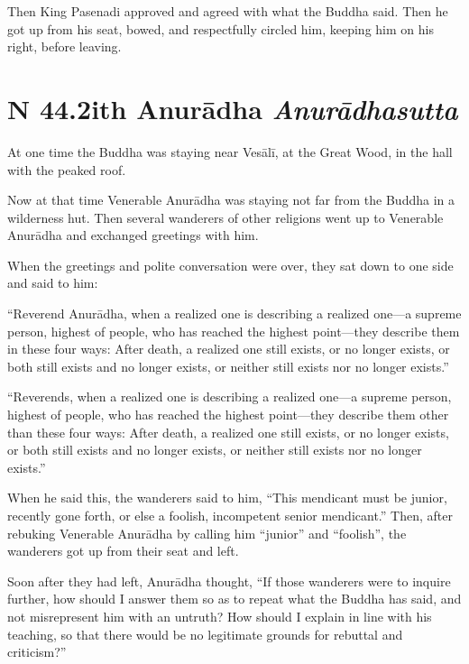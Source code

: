 \documentclass[12pt,openany]{book}%
\newcommand*{\suttatitleacronym}[1]{\smaller[2]{#1}\vspace*{.3em}}
\newcommand*{\suttatitletranslation}[1]{\linebreak{#1}}
\newcommand*{\suttatitleroot}[1]{\linebreak\smaller[2]\itshape{#1}}
\newcommand*{\tocacronym}[1]{\hspace*{-3.3em}{#1}\quad}
\newcommand*{\toctranslation}[1]{#1}
\newcommand*{\tocroot}[1]{(\textit{#1})}
\begin{document}
Then King Pasenadi approved and agreed with what the Buddha said. Then he got up from his seat, bowed, and respectfully circled him, keeping him on his right, before leaving. 

%
\section*{{\suttatitleacronym SN 44.2}{\suttatitletranslation With Anurādha }{\suttatitleroot Anurādhasutta}}
\addcontentsline{toc}{section}{\tocacronym{SN 44.2} \toctranslation{With Anurādha } \tocroot{Anurādhasutta}}

At one time the Buddha was staying near \textsanskrit{Vesālī}, at the Great Wood, in the hall with the peaked roof. 

Now at that time Venerable \textsanskrit{Anurādha} was staying not far from the Buddha in a wilderness hut. Then several wanderers of other religions went up to Venerable \textsanskrit{Anurādha} and exchanged greetings with him. 

When the greetings and polite conversation were over, they sat down to one side and said to him: 

“Reverend \textsanskrit{Anurādha}, when a realized one is describing a realized one—a supreme person, highest of people, who has reached the highest point—they describe them in these four ways: After death, a realized one still exists, or no longer exists, or both still exists and no longer exists, or neither still exists nor no longer exists.” 

“Reverends, when a realized one is describing a realized one—a supreme person, highest of people, who has reached the highest point—they describe them other than these four ways: After death, a realized one still exists, or no longer exists, or both still exists and no longer exists, or neither still exists nor no longer exists.” 

When he said this, the wanderers said to him, “This mendicant must be junior, recently gone forth, or else a foolish, incompetent senior mendicant.” Then, after rebuking Venerable \textsanskrit{Anurādha} by calling him “junior” and “foolish”, the wanderers got up from their seat and left. 

Soon after they had left, \textsanskrit{Anurādha} thought, “If those wanderers were to inquire further, how should I answer them so as to repeat what the Buddha has said, and not misrepresent him with an untruth? How should I explain in line with his teaching, so that there would be no legitimate grounds for rebuttal and criticism?” 
\end{document}
